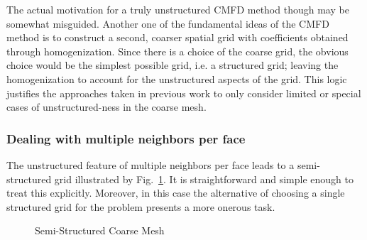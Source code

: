 \documentclass{anstrans}
\newcommand{\figref}[1]{Fig.~\ref{#1}}
\begin{document}
The actual motivation for a truly unstructured CMFD method though may be somewhat misguided. Another one of the fundamental ideas of the CMFD method is to construct a second, coarser spatial grid with coefficients obtained through homogenization. Since there is a choice of the coarse grid, the obvious choice would be the simplest possible grid, i.e. a structured grid; leaving the homogenization to account for the unstructured aspects of the grid. This logic justifies the approaches taken in previous work \cite{CHO2008,Kim2011} to only consider limited or special cases of unstructured-ness in the coarse mesh.

\subsubsection{Dealing with multiple neighbors per face}
The unstructured feature of multiple neighbors per face leads to a semi-structured grid illustrated by \figref{fig:ssCM}. It is straightforward and simple enough to treat this explicitly. Moreover, in this case the alternative of choosing a single structured grid for the problem presents a more onerous task.

%
\begin{figure}[!ht]
    \centering
    \caption{Semi-Structured Coarse Mesh}
    \label{fig:ssCM}
\end{figure}
%
\end{document}
